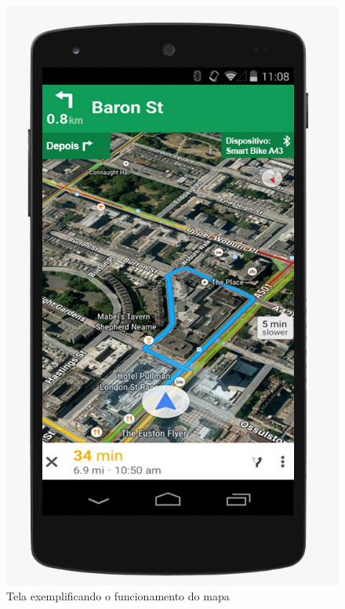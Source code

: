 	\graphicspath{{figuras/}}
	\begin{figure}[!htb]
	\centering
	\includegraphics[scale=0.40]{mapa.jpeg}
	\caption{Tela exemplificando o funcionamento do mapa}
	\label{img:mapa}
	\end{figure}
	
\newpage
	

